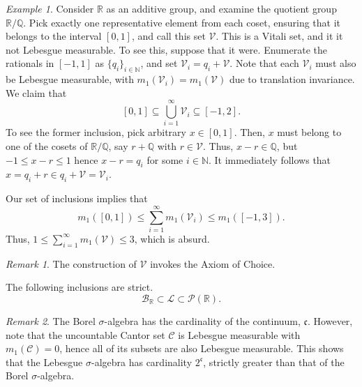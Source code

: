\documentclass[11pt]{article}
\newcommand{\R}{\mathbb{R}}
\newcommand{\Q}{\mathbb{Q}}
\newcommand{\N}{\mathbb{N}}
\renewcommand{\L}{\mathcal{L}}
\theoremstyle{definition}
\theoremstyle{remark}
\newtheorem*{remark}{Remark}
\newtheorem*{example}{Example}
\numberwithin{equation}{section}
\begin{document}
    \begin{example}
        Consider $\R$ as an additive group, and examine the quotient group $\R/\Q$.
        Pick exactly one representative element from each coset, ensuring that it
        belongs to the interval $[0, 1]$, and call this set $\mathcal{V}$. This is a
        Vitali set, and it it not Lebesgue measurable. To see this, suppose that it
        were. Enumerate the rationals in $[-1, 1]$ as $\{q_i\}_{i \in \N}$, and set
        $\mathcal{V}_i = q_i + \mathcal{V}$. Note that each $\mathcal{V}_i$ must also
        be Lebesgue measurable, with $m_1(\mathcal{V}_i) = m_1(\mathcal{V})$ due to
        translation invariance. We claim that \[
            [0, 1] \subseteq \bigcup_{i = 1}^\infty
            \mathcal{V}_i \subseteq [-1, 2].
        \] To see the former inclusion, pick arbitrary $x \in [0, 1]$. Then, $x$ must
        belong to one of the cosets of $\R/\Q$, say $r + \Q$ with $r \in
        \mathcal{V}$.  Thus, $x - r \in \Q$, but $-1 \leq x - r \leq 1$ hence $x - r
        = q_i$ for some $i \in \N$. It immediately follows that $x = q_i + r \in q_i
        + \mathcal{V} = \mathcal{V}_i$.

        Our set of inclusions implies that \[
            m_1([0, 1]) \leq \sum_{i = 1}^\infty m_1(\mathcal{V}_i) \leq m_1([-1, 3]).
        \] Thus, $1 \leq \sum_{i = 1}^\infty m_1(\mathcal{V}) \leq 3$, which is
        absurd.

        \begin{remark}
            The construction of $\mathcal{V}$ invokes the Axiom of Choice.
        \end{remark}
    \end{example}

    \begin{lemma}
        The following inclusions are strict. \[
            \mathcal{B}_\R \subset \L \subset \mathcal{P}(\R).
        \]
        \begin{remark}
            The Borel $\sigma$-algebra has the cardinality of the continuum,
            $\mathfrak{c}$. However, note that the uncountable Cantor set
            $\mathcal{C}$ is Lebesgue measurable with $m_1(\mathcal{C}) = 0$, hence
            all of its subsets are also Lebesgue measurable. This shows that the
            Lebesgue $\sigma$-algebra has cardinality $2^\mathfrak{c}$, strictly
            greater than that of the Borel $\sigma$-algebra.
        \end{remark}
    \end{lemma}
\end{document}
